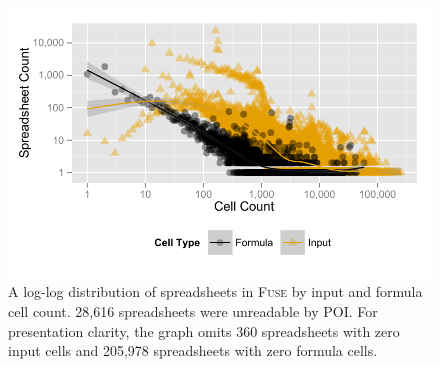 \documentclass[conference]{IEEEtran}
\begin{document}
\begin{figure}
\centering
\includegraphics[width=0.85\columnwidth]{figures/cellcount}
\caption{
A log-log distribution of spreadsheets in \textsc{Fuse} by input and formula cell count. 28,616 spreadsheets were unreadable by POI. For presentation clarity, the graph omits 360 spreadsheets with zero input cells and 205,978 spreadsheets with zero formula cells.    
\label{fig:corpus_overview}}
\end{figure}







\end{document}
